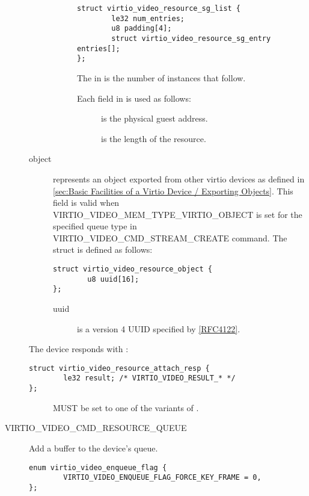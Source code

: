 \begin{description}
\begin{description}
\begin{description}
\begin{lstlisting}
struct virtio_video_resource_sg_list {
        le32 num_entries;
        u8 padding[4];
        struct virtio_video_resource_sg_entry entries[];
};
\end{lstlisting}
The  in  is the number
of  instances that follow.

Each field in  is used as follows:
    \begin{description}
    \item[] is the physical guest address.
    \item[] is the length of the resource.
    \end{description}
  \end{description}
  \item[object] represents an object exported from other virtio devices as
    defined in \ref{sec:Basic Facilities of a Virtio Device / Exporting
      Objects}. This field is valid when VIRTIO_VIDEO_MEM_TYPE_VIRTIO_OBJECT is
    set for the specified queue type in VIRTIO_VIDEO_CMD_STREAM_CREATE command.
    The struct  is defined as follows:
    \begin{lstlisting}
struct virtio_video_resource_object {
        u8 uuid[16];
};
    \end{lstlisting}
    \begin{description}
    \item[uuid] is a version 4 UUID specified by
      \hyperref[intro:rfc4122]{[RFC4122]}.
    \end{description}
\end{description}

The device responds with :
\begin{lstlisting}
struct virtio_video_resource_attach_resp {
        le32 result; /* VIRTIO_VIDEO_RESULT_* */
};
\end{lstlisting}
\begin{description}
\item[] MUST be set to one of the variants of .
\end{description}

\item[VIRTIO_VIDEO_CMD_RESOURCE_QUEUE] Add a buffer to the device's
queue.

\begin{lstlisting}
enum virtio_video_enqueue_flag {
        VIRTIO_VIDEO_ENQUEUE_FLAG_FORCE_KEY_FRAME = 0,
};


\end{lstlisting}
\end{description}
